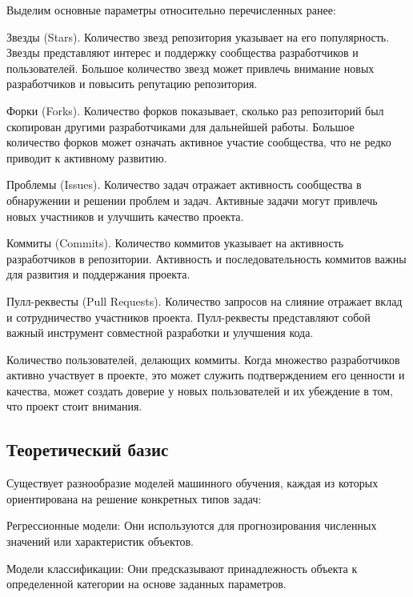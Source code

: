  Выделим основные параметры относительно перечисленных ранее:
 \begin{itemizecustom}
     \item Звезды (Stars). Количество звезд  репозитория указывает на его популярность. Звезды представляют интерес и поддержку сообщества разработчиков и пользователей. Большое количество звезд может привлечь внимание новых разработчиков и повысить репутацию репозитория.
     \item Форки (Forks). Количество форков показывает, сколько раз репозиторий был скопирован другими разработчиками для дальнейшей работы. Большое количество форков может означать активное участие сообщества, что не редко приводит к активному развитию.
    \item Проблемы (Issues). Количество задач отражает активность сообщества в обнаружении и решении проблем и задач. Активные задачи могут привлечь новых участников и улучшить качество проекта.
    \item Коммиты (Commits). Количество коммитов указывает на активность разработчиков в репозитории. Активность и последовательность коммитов важны для развития и поддержания проекта.
    \item Пулл-реквесты (Pull Requests). Количество запросов на слияние отражает вклад и сотрудничество участников проекта. Пулл-реквесты представляют собой важный инструмент совместной разработки и улучшения кода.
    \item Количество пользователей, делающих коммиты. Когда множество разработчиков активно участвует в проекте, это может служить подтверждением его ценности и качества, может создать доверие у новых пользователей и их убеждение в том, что проект стоит внимания.
 \end{itemizecustom}

\subsection{Теоретический базис}

\label{sec:Models}

Существует разнообразие моделей машинного обучения, каждая из которых ориентирована на решение конкретных типов задач:
\begin{itemizecustom}
    \item     Регрессионные модели: Они используются для прогнозирования численных значений или характеристик объектов.

    \item     Модели классификации: Они предсказывают принадлежность объекта к определенной категории на основе заданных параметров. 
\end{itemizecustom}

